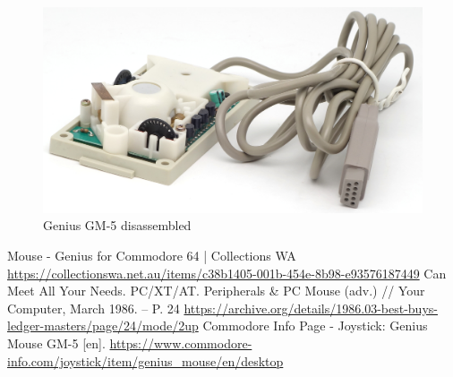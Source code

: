 \documentclass[11pt, a4paper]{article}
\begin{document}
 \begin{figure}[h]
    \centering
    \includegraphics[scale=0.65]{1987_genius_gm5_mouse/inside_30.jpg}
    \caption{Genius GM-5 disassembled}
    \label{fig:GM5MouseInside}
\end{figure}

\begin{thebibliography}{9}
 Mouse - Genius for Commodore 64 | Collections WA \url{https://collectionswa.net.au/items/c38b1405-001b-454e-8b98-e93576187449}
 Can Meet All Your Needs. PC/XT/AT. Peripherals \& PC Mouse (adv.) // Your Computer, March 1986. -- P. 24 \url{https://archive.org/details/1986.03-best-buys-ledger-masters/page/24/mode/2up}
 Commodore Info Page - Joystick: Genius Mouse GM-5 [en]. \url{https://www.commodore-info.com/joystick/item/genius_mouse/en/desktop}
\end{thebibliography}
\end{document}
